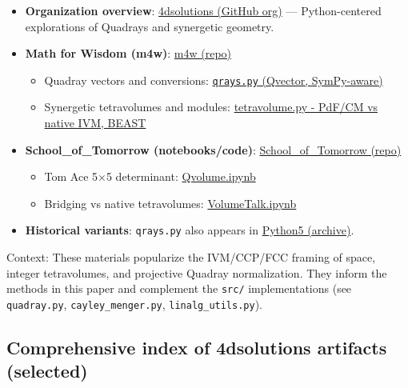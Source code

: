 \documentclass[
]{article}
\providecommand{\tightlist}{%
  \setlength{\itemsep}{0pt}\setlength{\parskip}{0pt}}
\begin{document}
\begin{itemize}
\tightlist
\item
  \textbf{Organization overview}:
  \href{https://github.com/4dsolutions}{4dsolutions (GitHub org)} ---
  Python-centered explorations of Quadrays and synergetic geometry.
\item
  \textbf{Math for Wisdom (m4w)}:
  \href{https://github.com/4dsolutions/m4w}{m4w (repo)}

  \begin{itemize}
  \tightlist
  \item
    Quadray vectors and conversions:
    \href{https://github.com/4dsolutions/m4w/blob/main/qrays.py}{\texttt{qrays.py}
    (Qvector, SymPy-aware)}
  \item
    Synergetic tetravolumes and modules:
    \href{https://github.com/4dsolutions/m4w/blob/main/tetravolume.py}{tetravolume.py
    - PdF/CM vs native IVM, BEAST}
  \end{itemize}
\item
  \textbf{School\_of\_Tomorrow (notebooks/code)}:
  \href{https://github.com/4dsolutions/School_of_Tomorrow}{School\_of\_Tomorrow
  (repo)}

  \begin{itemize}
  \tightlist
  \item
    Tom Ace 5×5 determinant:
    \href{https://github.com/4dsolutions/School_of_Tomorrow/blob/master/Qvolume.ipynb}{Qvolume.ipynb}
  \item
    Bridging vs native tetravolumes:
    \href{https://github.com/4dsolutions/School_of_Tomorrow/blob/master/VolumeTalk.ipynb}{VolumeTalk.ipynb}
  \end{itemize}
\item
  \textbf{Historical variants}: \texttt{qrays.py} also appears in
  \href{https://github.com/4dsolutions/Python5/blob/master/qrays.py}{Python5
  (archive)}.
\end{itemize}

Context: These materials popularize the IVM/CCP/FCC framing of space,
integer tetravolumes, and projective Quadray normalization. They inform
the methods in this paper and complement the \texttt{src/}
implementations (see \texttt{quadray.py}, \texttt{cayley\_menger.py},
\texttt{linalg\_utils.py}).

\hypertarget{comprehensive-index-of-4dsolutions-artifacts-selected}{%
\subsection{Comprehensive index of 4dsolutions artifacts
(selected)}\label{comprehensive-index-of-4dsolutions-artifacts-selected}}
\end{document}
